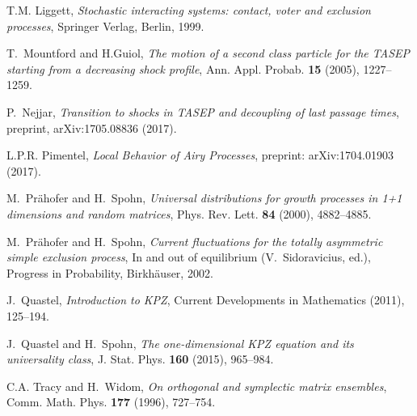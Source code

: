 \documentclass[12pt,a4paper]{article}
\numberwithin{equation}{section}
\begin{document}
\begin{thebibliography}{10}
T.M. Liggett, \emph{Stochastic interacting systems: contact, voter and
  exclusion processes}, Springer Verlag, Berlin, 1999.

T.~Mountford and H.Guiol, \emph{{The motion of a second class particle for the
  TASEP starting from a decreasing shock profile}}, Ann. Appl. Probab.
  \textbf{15} (2005), 1227--1259.

P.~Nejjar, \emph{{Transition to shocks in TASEP and decoupling of last passage
  times}}, preprint, arXiv:1705.08836 (2017).

L.P.R. Pimentel, \emph{{Local Behavior of Airy Processes}}, preprint:
  arXiv:1704.01903 (2017).

M.~Pr{\"a}hofer and H.~Spohn, \emph{Universal distributions for growth
  processes in 1+1 dimensions and random matrices}, Phys. Rev. Lett.
  \textbf{84} (2000), 4882--4885.

M.~Pr{\"a}hofer and H.~Spohn, \emph{Current fluctuations for the totally
  asymmetric simple exclusion process}, In and out of equilibrium
  (V.~Sidoravicius, ed.), Progress in Probability, Birkh{\"a}user, 2002.

J.~Quastel, \emph{{Introduction to KPZ}}, Current Developments in Mathematics
  (2011), 125--194.

J.~Quastel and H.~Spohn, \emph{{The one-dimensional KPZ equation and its
  universality class}}, J. Stat. Phys. \textbf{160} (2015), 965--984.

C.A. Tracy and H.~Widom, \emph{On orthogonal and symplectic matrix ensembles},
  Comm. Math. Phys. \textbf{177} (1996), 727--754.

\end{thebibliography}

%
%
\end{document}
